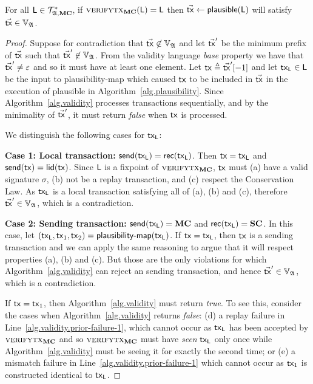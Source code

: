 \begin{lemma}[Plausibility]\label{lem:plausibility}
  For all $\mathsf{L} \in \mathcal{T}_{\mathfrak{A},\mathbf{MC}}^*$, if $\textsc{verifytx}_{\mathbf{MC}}(\mathsf{L}) =
  \mathsf{L}$ then $\vec{\mathsf{tx}} \gets \textsf{plausible}(\mathsf{L})$ will satisfy $\vec{\mathsf{tx}} \in
  \mathbb{V}_{\mathfrak{A}}$.
\end{lemma}
\begin{proof}
  Suppose for contradiction that $\vec{\mathsf{tx}} \not\in
  \mathbb{V}_{\mathfrak{A}}$ and let $\vec{\mathsf{tx}}'$ be the minimum prefix of $\vec{\mathsf{tx}}$ such
  that $\vec{\mathsf{tx}}' \not \in \mathbb{V}_{\mathfrak{A}}$. From the validity language
  \emph{base} property we have that $\vec{\mathsf{tx}}' \neq \varepsilon$ and so it must have at
  least one element. Let $\mathsf{tx} \triangleq \vec{\mathsf{tx}}'[-1]$ and let $\mathsf{tx}_{\mathsf{L}} \in \mathsf{L}$ be the input
  to \textsf{plausibility-map} which caused $\mathsf{tx}$ to be included in $\vec{\mathsf{tx}}$ in
  the execution of \textsf{plausible} in Algorithm~\ref{alg.plausibility}.
  Since Algorithm~\ref{alg.validity} processes transactions sequentially, and
  by the minimality of $\vec{\mathsf{tx}}'$, it must return \emph{false} when $\mathsf{tx}$ is
  processed.

  We distinguish the following cases for $\mathsf{tx}_{\mathsf{L}}$:

  \textbf{Case 1: Local transaction:} $\mathsf{send}(\mathsf{tx}_{\mathsf{L}}) = \mathsf{rec}(\mathsf{tx}_{\mathsf{L}})$.
  Then $\mathsf{tx} = \mathsf{tx}_{\mathsf{L}}$ and $\mathsf{send}(\mathsf{tx}) = \mathsf{lid}(\mathsf{tx})$. Since
  $\mathsf{L}$ is a fixpoint of $\textsc{verifytx}_{\mathbf{MC}}$,
  $\mathsf{tx}$ must (a) have a valid signature $\sigma$, (b) not be a replay transaction,
  and (c) respect the Conservation Law. As $\mathsf{tx}_{\mathsf{L}}$ is a local
  transaction satisfying all of (a), (b) and (c), therefore
  $\vec{\mathsf{tx}}' \in \mathbb{V}_{\mathfrak{A}}$, which is a contradiction.

  \textbf{Case 2: Sending transaction:} $\mathsf{send}(\mathsf{tx}_{\mathsf{L}}) = \mathbf{MC}$ and $\mathsf{rec}(\mathsf{tx}_{\mathsf{L}}) =
  \mathbf{SC}$. In this case, let $(\mathsf{tx}_{\mathsf{L}}, \mathsf{tx}_1, \mathsf{tx}_2) = \textsf{plausibility-map}(\mathsf{tx}_{\mathsf{L}})$.
  If $\mathsf{tx} = \mathsf{tx}_{\mathsf{L}}$,
  then $\mathsf{tx}$ is a sending transaction
  and we can apply the same
  reasoning to argue that it will respect properties (a), (b) and (c). But those
  are the only violations for which Algorithm~\ref{alg.validity} can reject an
  sending transaction, and hence $\vec{\mathsf{tx}}' \in \mathbb{V}_{\mathfrak{A}}$, which is a
  contradiction.

  If $\mathsf{tx} = \mathsf{tx}_1$, then Algorithm~\ref{alg.validity} must return \emph{true}.
  To see this, consider the cases when Algorithm~\ref{alg.validity} returns
  \emph{false}: (d) a replay failure in Line~\ref{alg.validity.prior-failure-1},
  which cannot occur as $\mathsf{tx}_{\mathsf{L}}$ has been accepted by $\textsc{verifytx}_{\mathbf{MC}}$ and
  so $\textsc{verifytx}_{\mathbf{MC}}$ must have \emph{seen} $\mathsf{tx}_{\mathsf{L}}$ only once while
  Algorithm~\ref{alg.validity} must be seeing it for exactly the second time; or
  (e) a mismatch failure in Line~\ref{alg.validity.prior-failure-1} which cannot
  occur as $\mathsf{tx}_1$ is constructed identical to $\mathsf{tx}_{\mathsf{L}}$.


\end{proof}
